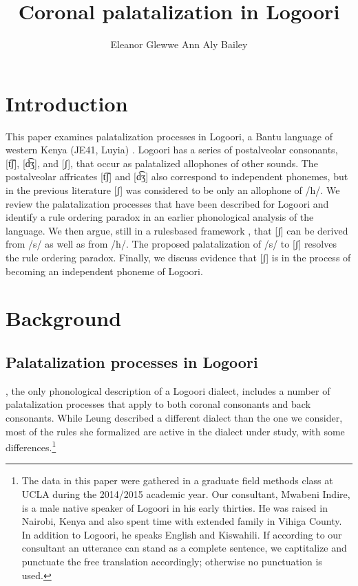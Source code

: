 \documentclass[output=paper]{langsci/langscibook}
\title{Coronal palatalization in Logoori}
\author{%
 Eleanor Glewwe\affiliation{University of California, Los Angeles}\lastand 
 Ann Aly Bailey \affiliation{University of California, Los Angeles}
}
\begin{document}
 



\section{Introduction}

This paper examines palatalization processes in Logoori, a Bantu language of western Kenya (JE41, Luyia) \citep{Mould1981,Bastin2003}. Logoori has a series of postalveolar consonants, [t͡ʃ], [d͡ʒ], and [ʃ], that occur as palatalized allophones of other sounds. The postalveolar affricates [t͡ʃ] and [d͡ʒ] also correspond to independent phonemes, but in the previous literature [ʃ] was considered to be only an allophone of /h/. We review the palatalization processes that have been described for Logoori and identify a rule ordering paradox in an earlier phonological analysis of the language. We then argue, still in a rulesbased framework \citep{ChomskyHalle1968}, that [ʃ] can be derived from /s/ as well as from /h/. The proposed palatalization of /s/ to [ʃ] resolves the rule ordering paradox. Finally, we discuss evidence that [ʃ] is in the process of becoming an independent phoneme of Logoori.

\section{Background}
\subsection{Palatalization processes in Logoori} %

\citet{Leung1991}, the only phonological description of a Logoori dialect, includes a number of palatalization processes that apply to both coronal consonants and back consonants. While Leung described a different dialect than the one we consider, most of the rules she formalized are active in the dialect under study, with some differences.\footnote{The data in this paper were gathered in a graduate field methods class at UCLA during the 2014/2015 academic year. Our consultant, Mwabeni Indire, is a male native speaker of Logoori in his early thirties. He was raised in Nairobi, Kenya and also spent time with extended family in Vihiga County. In addition to Logoori, he speaks English and Kiswahili. If according to our consultant an utterance can stand as a complete sentence, we captitalize and punctuate the free translation accordingly; otherwise no punctuation is used.} 
\end{document}
